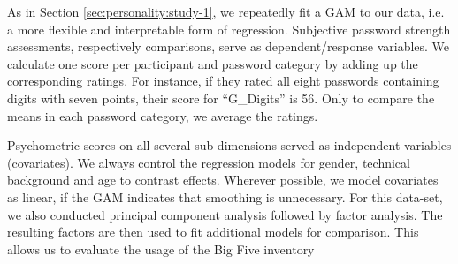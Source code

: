 As in Section \ref{sec:personality:study-1}, we repeatedly fit a \gls{GAM} to our data, i.e. a more flexible and interpretable form of regression. 
Subjective password strength assessments, respectively comparisons, serve as dependent/response variables. We calculate one score per participant and password category by adding up the corresponding ratings. For instance, if they rated all eight passwords containing digits with seven points, their score for ``G\_Digits'' is 56. Only to compare the means in each password category, we average the ratings. 

Psychometric scores on all several sub-dimensions served as independent variables (covariates). We always control the regression models for gender, technical background and age to contrast effects. Wherever possible, we model covariates as linear, if the GAM indicates that smoothing is unnecessary. For this data-set, we also conducted principal component analysis followed by factor analysis. The resulting factors are then used to fit additional models for comparison. This allows us to evaluate the usage of the Big Five inventory



